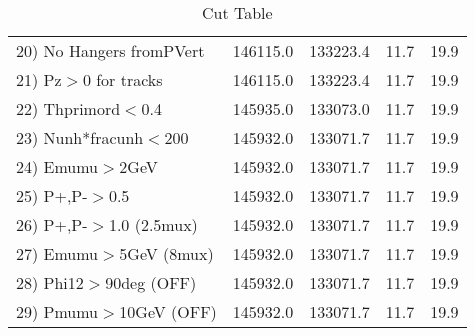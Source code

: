 \begin{table}[h!]
\begin{tabular}{||l||r|r|r|r||}
 20) No Hangers fromPVert &    146115.0 &    133223.4 &        11.7 &        19.9 \\
 21) Pz$>$0 for tracks    &    146115.0 &    133223.4 &        11.7 &        19.9 \\
 22) Thprimord$<$0.4      &    145935.0 &    133073.0 &        11.7 &        19.9 \\
 23) Nunh*fracunh$<$200   &    145932.0 &    133071.7 &        11.7 &        19.9 \\
 24) Emumu$>$2GeV         &    145932.0 &    133071.7 &        11.7 &        19.9 \\
 25) P+,P-$>$0.5          &    145932.0 &    133071.7 &        11.7 &        19.9 \\
 26) P+,P-$>$1.0 (2.5mux) &    145932.0 &    133071.7 &        11.7 &        19.9 \\
 27) Emumu$>$5GeV  (8mux) &    145932.0 &    133071.7 &        11.7 &        19.9 \\
 28) Phi12$>$90deg  (OFF) &    145932.0 &    133071.7 &        11.7 &        19.9 \\
 29) Pmumu$>$10GeV  (OFF) &    145932.0 &    133071.7 &        11.7 &        19.9 \\
 \hline
 \hline
 \end{tabular}
 \caption{Cut Table \cohjp  }
 \label{tab-cut__jpsi}
 \end{table}
